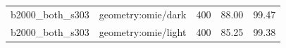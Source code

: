 \begin{longtable}{l>{\raggedright\arraybackslash}p{.42\linewidth}rrr}
b2000\_\allowbreak{}both\_\allowbreak{}s303 & %
geometry:omie/dark & %
400 & %
88.00 & %
99.47 \\ %

b2000\_\allowbreak{}both\_\allowbreak{}s303 & %
geometry:omie/light & %
400 & %
85.25 & %
99.38 \\ %


\end{longtable}
